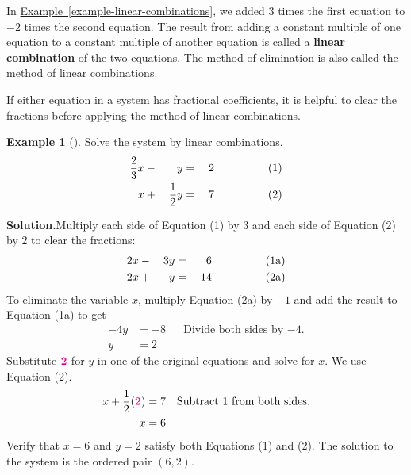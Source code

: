 \documentclass[10pt,]{book}
\newcommand{\terminology}[1]{\textbf{#1}}
\theoremstyle{plain}
\theoremstyle{definition}
\theoremstyle{definition}
\newtheorem{example}[theorem]{Example}
\theoremstyle{definition}
\numberwithin{equation}{part}
\newcommand{\alert}[1]{\boldsymbol{\color{magenta}{#1}}}
\newcommand{\amp}{&}
\begin{document}
\par
In \hyperref[example-linear-combinations]{Example~\ref{example-linear-combinations}}, we added \(3\) times the first equation to \(-2\) times the second equation. The result from adding a constant multiple of one equation to a constant multiple of another equation is called a \terminology{linear combination} of the two equations. The method of elimination is also called the method of linear combinations.%
\par
If either equation in a system has fractional coefficients, it is helpful to clear the fractions before applying the method of linear combinations.%
\begin{example}[]\label{example-32}
Solve the system by linear combinations.%
\begin{alignat*}{3}
\frac{2}{3}x\amp {}-{}\amp y\amp ={}\amp 2 \hphantom{blankblank}\amp(1)\\
x\amp {}+{}\amp \frac{1}{2}y\amp ={}\amp 7 \hphantom{blankblank}\amp(2)
\end{alignat*}
%
\par\medskip\noindent%
\textbf{Solution.}\quad Multiply each side of Equation (1) by \(3\) and each side of Equation (2) by \(2\) to clear the fractions:%
\begin{alignat*}{3}
2x\amp {}-{}\amp 3y\amp ={}\amp 6 \hphantom{blankblank}\amp(1\text{a})\\
2x\amp {}+{}\amp y\amp ={}\amp 14 \hphantom{blankblank}\amp(2\text{a})
\end{alignat*}
To eliminate the variable \(x\), multiply Equation (2a) by \(-1\) and add the result to Equation (1a) to get%
\begin{align*}
−4y \amp = −8 \amp\amp\text{Divide both sides by −4.}\\
y \amp = 2
\end{align*}
Substitute \(\alert{2}\) for \(y\) in one of the original equations and solve for \(x\). We use Equation (2).%
\begin{align*}
x + \frac{1}{2}(\alert{2}) \amp = 7 \amp\amp\text{Subtract 1 from both sides.}\\
x \amp = 6
\end{align*}
Verify that \(x=6\) and \(y=2\) satisfy both Equations (1) and (2). The solution to the system is the ordered pair \((6, 2)\).%
\end{example}
\typeout{************************************************}
\typeout{************************************************}
\end{document}
